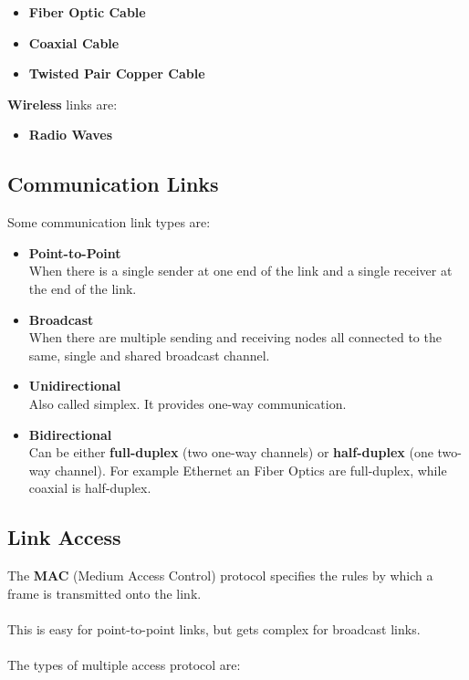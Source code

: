 \documentclass{article}
\begin{document}
\begin{itemize}
	\item \textbf{Fiber Optic Cable}
	\item \textbf{Coaxial Cable}
	\item \textbf{Twisted Pair Copper Cable}
\end{itemize}
\textbf{Wireless} links are:

\begin{itemize}
	\item \textbf{Radio Waves}
\end{itemize}

\subsection{Communication Links}
Some communication link types are:

\begin{itemize}
	\item \textbf{Point-to-Point}
	\vspace{.2cm} \\
	When there is a single sender at one end of the link and a single receiver at the end of the link.
	
	\item \textbf{Broadcast}
	\vspace{.2cm} \\
	When there are multiple sending and receiving nodes all connected to the same, single and shared broadcast channel.
	
	\item \textbf{Unidirectional}
	\vspace{.2cm} \\
	Also called simplex. It provides one-way communication.
	
	\item \textbf{Bidirectional}
	\vspace{.2cm} \\
	Can be either \textbf{full-duplex} (two one-way channels) or \textbf{half-duplex} (one two-way channel). For example Ethernet an Fiber Optics are full-duplex, while coaxial is half-duplex.
\end{itemize}

\subsection{Link Access}
The \textbf{MAC} (Medium Access Control) protocol specifies the rules by which a frame is transmitted onto the link. \\ \\
This is easy for point-to-point links, but gets complex for broadcast links. \\ \\
The types of multiple access protocol are:
\end{document}
